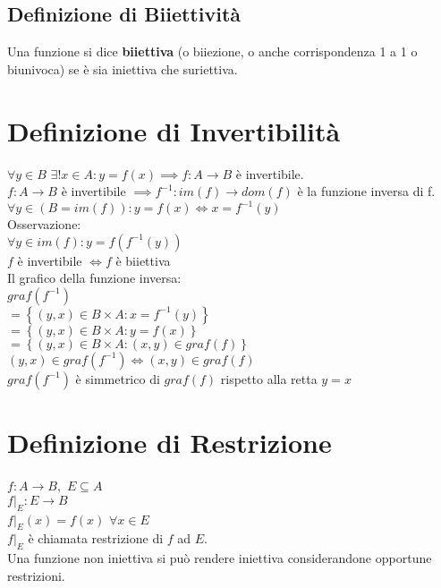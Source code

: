 \documentclass[a4paper, twoside, italian, 11pt]{book}
\newcommand{\braces}[1] {\left\{#1\right\}}
\begin{document}
\subsection{Definizione di Biiettività}

Una funzione si dice \textbf{biiettiva} (o biiezione, o anche corrispondenza 1 a 1 o biunivoca) se è sia iniettiva che suriettiva.



\section{Definizione di Invertibilità}

\noindent
$\forall y \in B$ $\exists! x \in A : y = f(x) \implies f : A \rightarrow B$ è invertibile. \\

\noindent
$f : A \rightarrow B$ è invertibile $\implies f^{-1} : im(f) \rightarrow dom(f)$ è la funzione inversa di f. \\

\noindent
$\forall y \in (B = im(f)) : y = f(x) \iff x = f^{-1}(y)$ \\

\noindent
Osservazione: \\

\noindent
$\forall y \in im(f) : y = f(f^{-1}(y))$ \\

\noindent
$f$ è invertibile $\iff f$ è biiettiva \\

\noindent
Il grafico della funzione inversa: \\
$graf(f^{-1})$ \\
$= \braces{(y, x) \in B \times A : x = f^{-1}(y)}$ \\
$= \braces{(y, x) \in B \times A : y = f(x)}$ \\
$= \braces{(y, x) \in B \times A : (x, y) \in graf(f)}$ \\

\noindent
$(y, x) \in graf(f^{-1}) \iff (x, y) \in graf(f)$ \\

\noindent
$graf(f^{-1})$ è simmetrico di $graf(f)$ rispetto alla retta $y = x$



\section{Definizione di Restrizione}

\noindent
$f : A \rightarrow B,$ $E \subseteq A$ \\

\noindent
$f|_E : E \rightarrow B$ \\
$f|_E(x) = f(x)$ $\forall x \in E$ \\

\noindent
$f|_E$ è chiamata restrizione di $f$ ad $E$. \\

\noindent
Una funzione non iniettiva si può rendere iniettiva considerandone opportune restrizioni. %
\end{document}
